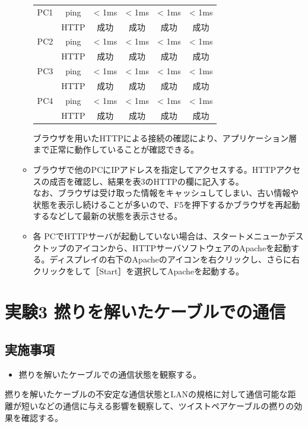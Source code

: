 \documentclass[10pt]{article}
\begin{document}
\begin{enumerate}
\begin{itemize}
\begin{table}[H]
\begin{tabular}{|c|c|c|c|c|c|}
        		\hline\hline
        	        PC1 & ping & < 1ms & < 1ms & < 1ms & < 1ms \\ 
        	        & HTTP & 成功 & 成功 & 成功 & 成功 \\ \hline
        	        PC2 & ping & < 1ms & < 1ms & < 1ms & < 1ms \\ 
        	        & HTTP & 成功 & 成功 & 成功 & 成功 \\ \hline
        	        PC3 & ping & < 1ms & < 1ms & < 1ms & < 1ms \\ 
        	        & HTTP & 成功 & 成功 & 成功 & 成功 \\ \hline
        	        PC4 & ping & < 1ms & < 1ms & < 1ms & < 1ms \\ 
        	        & HTTP & 成功 & 成功 & 成功 & 成功 \\ \hline
            
        	\end{tabular}
        \end{table} 
        \endgroup
        ブラウザを用いたHTTPによる接続の確認により、アプリケーション層まで正常に動作していることが確認できる。
        
        \item ブラウザで他のPCにIPアドレスを指定してアクセスする。HTTPアクセスの成否を確認し、結果を表3のHTTPの欄に記入する。 \\ なお、ブラウザは受け取った情報をキャッシュしてしまい、古い情報や状態を表示し続けることが多いので、F5を押下するかブラウザを再起動するなどして最新の状態を表示させる。
        \item 各 PCでHTTPサーバが起動していない場合は、スタートメニューかデスクトップのアイコンから、HTTPサーバソフトウェアのApacheを起動する。ディスプレイの右下のApacheのアイコンを右クリックし、さらに右クリックをして［Start］を選択してApacheを起動する。
    \end{itemize}
\end{enumerate}

\pagebreak

\section{実験3 撚りを解いたケーブルでの通信}

\subsection{実施事項}

\begin{itemize}
    \item 撚りを解いたケーブルでの通信状態を観察する。
\end{itemize}
撚りを解いたケーブルの不安定な通信状態とLANの規格に対して通信可能な距離が短いなどの通信に与える影響を観察して、ツイストペアケーブルの撚りの効果を確認する。
\end{document}
